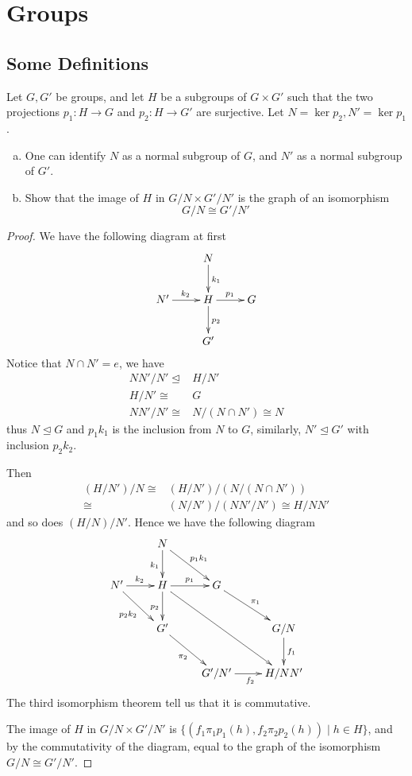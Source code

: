 \chapter{Groups}
\section{Some Definitions}
\begin{ex}
  Let $G,G'$ be groups, and let $H$ be a subgroups of $G\times G'$ such that the two projections $p_1\colon H\to G$ and $p_2\colon H\to G'$ are surjective. Let $N=\ker p_2, N'=\ker p_1$.
  \begin{enumerate}[a)]
    \setlength{\itemindent}{2ex}
    \item One can identify $N$ as a normal subgroup of $G$, and $N'$ as a normal subgroup of $G'$.
    \item Show that the image of $H$ in $G/N\times G'/N'$ is the graph of an isomorphism
    \begin{equation*}
      G/N\cong G'/N'
    \end{equation*}
  \end{enumerate}
\end{ex}
\begin{proof}
  We have the following diagram at first
\begin{displaymath}
   \xymatrix{
   &N\ar[d]^{k_1}&\\
   N'\ar[r]^{k_2}&H\ar[r]^{p_1}\ar[d]^{p_2}&G\\
   &G'&
   }
\end{displaymath}
Notice that $N\cap N'={e}$, we have
\begin{align*}
  NN'/N'\trianglelefteq&H/N' \\
  H/N' \cong& G\\
  NN'/N'\cong& N/(N\cap N')\cong N
\end{align*}
thus $N\trianglelefteq G$ and $p_1k_1$ is the inclusion from $N$ to $G$, similarly, $N'\trianglelefteq G'$ with inclusion $p_2k_2$.

Then
\begin{align*}
  (H/N')/N \cong& (H/N')/(N/(N\cap N')) \\
  \cong& (N/N')/(NN'/N') \cong H/NN'
\end{align*}
and so does $(H/N)/N'$. Hence we have the following diagram
\begin{displaymath}
   \xymatrix{
   &N\ar[d]_{k_1}\ar[dr]^{p_1k_1}&&\\
   N'\ar[r]^{k_2}\ar[dr]_{p_2k_2}&H\ar[r]^{p_1}\ar[d]_{p_2}\ar[ddrr]&G\ar[dr]^{\pi_1}&\\
   &G'\ar[dr]_{\pi_2}&&G/N\ar[d]^{f_1}\\
   &&G'/N'\ar[r]_{f_2}&H/NN'
   }
\end{displaymath}
The third isomorphism theorem tell us that it is commutative.

The image of $H$ in $G/N\times G'/N'$ is $\{(f_1\pi_1p_1(h),f_2\pi_2p_2(h))\mid h\in H\}$, and by the commutativity of the diagram, equal to the graph of the isomorphism $G/N\cong G'/N'$.
\end{proof}
